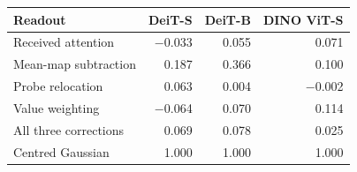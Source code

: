\begin{tabular}{@{}lrrr@{}}
\toprule
Readout & DeiT-S & DeiT-B & DINO ViT-S\\
\midrule
Received attention & $-$0.033 & 0.055 & 0.071 \\
Mean-map subtraction & 0.187 & 0.366 & 0.100 \\
Probe relocation & 0.063 & 0.004 & $-$0.002 \\
Value weighting & $-$0.064 & 0.070 & 0.114 \\
All three corrections & 0.069 & 0.078 & 0.025 \\
\midrule
Centred Gaussian & 1.000 & 1.000 & 1.000 \\
\bottomrule
\end{tabular}
